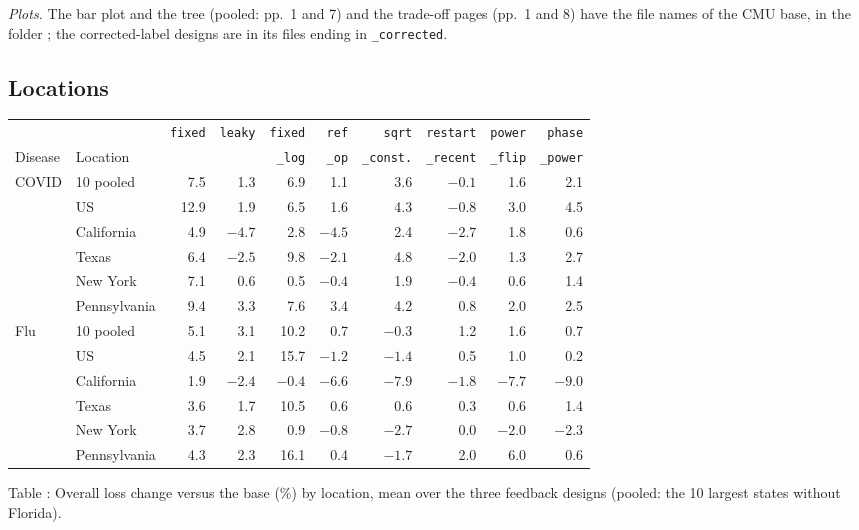 \documentclass[11pt,a4paper]{article}
\theoremstyle{definition}
\theoremstyle{remark}
\begin{document}
\emph{Plots.} The bar plot and the tree (pooled: pp.~1 and 7) and the
trade-off pages (pp.~1 and 8) have the file names of the CMU base, in the folder
; the corrected-label designs are in
its files ending in \texttt{\_corrected}.

\subsection{Locations}
\label{sec:results-locations}
\begin{center}\footnotesize
\setlength{\tabcolsep}{3.5pt}
\renewcommand{\arraystretch}{1.12}
\begin{tabular}{@{}llrrrrrrrr@{}}
\toprule
 & & \texttt{fixed} & \texttt{leaky} & \texttt{fixed} & \texttt{ref} & \texttt{sqrt} & \texttt{restart} & \texttt{power} & \texttt{phase}\\
Disease & Location & & & \texttt{\_log} & \texttt{\_op} & \texttt{\_const.} & \texttt{\_recent} & \texttt{\_flip} & \texttt{\_power}\\
\midrule
COVID & 10 pooled    & 7.5  & 1.3    & 6.9    & 1.1    & 3.6    & $-0.1$ & 1.6    & 2.1\\
      & US           & 12.9 & 1.9    & 6.5    & 1.6    & 4.3    & $-0.8$ & 3.0    & 4.5\\
      & California   & 4.9  & $-4.7$ & 2.8    & $-4.5$ & 2.4    & $-2.7$ & 1.8    & 0.6\\
      & Texas        & 6.4  & $-2.5$ & 9.8    & $-2.1$ & 4.8    & $-2.0$ & 1.3    & 2.7\\
      & New York     & 7.1  & 0.6    & 0.5    & $-0.4$ & 1.9    & $-0.4$ & 0.6    & 1.4\\
      & Pennsylvania & 9.4  & 3.3    & 7.6    & 3.4    & 4.2    & 0.8    & 2.0    & 2.5\\
\addlinespace
Flu   & 10 pooled    & 5.1  & 3.1    & 10.2   & 0.7    & $-0.3$ & 1.2    & 1.6    & 0.7\\
      & US           & 4.5  & 2.1    & 15.7   & $-1.2$ & $-1.4$ & 0.5    & 1.0    & 0.2\\
      & California   & 1.9  & $-2.4$ & $-0.4$ & $-6.6$ & $-7.9$ & $-1.8$ & $-7.7$ & $-9.0$\\
      & Texas        & 3.6  & 1.7    & 10.5   & 0.6    & 0.6    & 0.3    & 0.6    & 1.4\\
      & New York     & 3.7  & 2.8    & 0.9    & $-0.8$ & $-2.7$ & 0.0    & $-2.0$ & $-2.3$\\
      & Pennsylvania & 4.3  & 2.3    & 16.1   & 0.4    & $-1.7$ & 2.0    & 6.0    & 0.6\\
\bottomrule
\end{tabular}
\end{center}
\label{tab:results-locations}
\begin{center}\small Table \thetable: Overall loss change versus the base
(\%) by location, mean over the three feedback designs (pooled: the 10
largest states without Florida).
\end{center}
\end{document}
